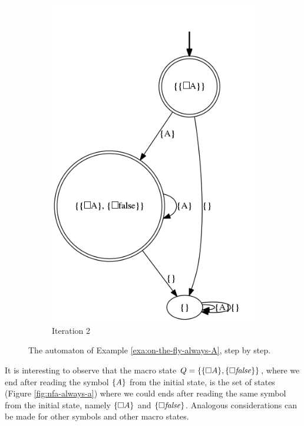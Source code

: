 \begin{example}
\begin{figure}[h]
	\begin{subfigure}[b]{0.35\textwidth}
		\includegraphics[width=\textwidth]{images/on-the-fly-always-A-it-complete}
		\caption{Iteration 2}
		\label{fig:exa-on-the-fly-always-A-it-complete}
	\end{subfigure}
	\caption{The automaton of Example \ref{exa:on-the-fly-always-A}, step by step.}\label{fig:exa-on-the-fly-always-A}
\end{figure}

It is interesting to observe that the macro state $Q = \{\{\Box A\}, \{\Box \mathit{false}\}\}$, where we end after reading the symbol $\{A\}$ from the initial state, is the set of \NFA states (Figure \ref{fig:nfa-always-a}) where we could ends after reading the same symbol from the initial state, namely $\{\Box A\}$ and $\{\Box \mathit{false}\}$. Analogous considerations can be made for other symbols and other macro states.


\end{example}
